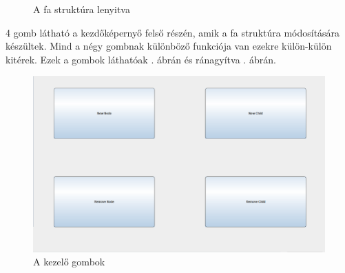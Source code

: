 \begin{figure} [H]
	\centering
	\caption{A fa struktúra lenyitva}
	\label{fig:treeexp}
\end{figure}

 4 gomb látható a kezdőképernyő felső részén, amik a fa struktúra módosítására készültek. Mind a négy gombnak különböző funkciója van ezekre külön-külön kitérek. Ezek a gombok láthatóak . ábrán és ránagyítva . ábrán.

\begin{figure} [H]
	\centering
	\includegraphics[height=.25\textheight]{images/node_buttons.png}
	\caption{A kezelő gombok}
	\label{fig:modify}
\end{figure}

